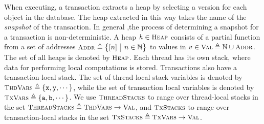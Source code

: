 \documentclass[a4paper,UKenglish]{article}%
\theoremstyle{plain}
\begin{document}
When executing, a transaction extracts a heap by selecting a version for each 
object in the database. The heap extracted in this way takes the name of the 
\emph{snapshot} of the transaction. In general ,the process of determining 
a snapshot for a transaction is non-deterministic.
A heap $\h \in \Heaps$ consists of a partial function 
from a set of addresses $\Addr \defeq \Setcon{ [\nat] }{\nat \in \Nat }$ to values in $ \val \in \Val \defeq \Nat \cup \Addr$. 
The set of all heaps is denoted by $\Heaps$.
Each thread has its own stack, 
where data for performing local computations is stored. Transactions also 
have a transaction-local stack. 
The set of thread-local stack variables is denoted by $\ThreadVars \defeq \{\pvar{x}, \pvar{y}, \cdots\}$, 
while the set of transaction local variables is denoted by $\TxVars \defeq \{\pvar{a}, \pvar{b}, \cdots\}$. 
We use $\ThdStacks$ to range over thread-local stacks in the set $\ThdStacks \defeq \ThreadVars \to \Val$, 
and $\TxStacks$ to range over transaction-local stacks in the set $\TxStacks \defeq \TxVars \to \Val$.
\end{document}
